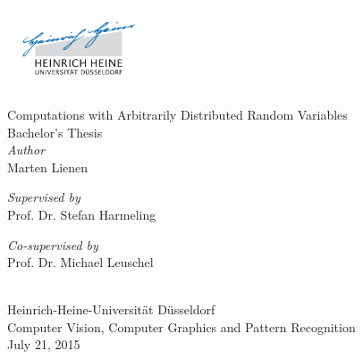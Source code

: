 \documentclass[11pt,a4paper]{book}
\begin{document}
\pagestyle{empty}

\frontmatter


\begin{titlepage}
  \begingroup
  \begin{center}
    \includegraphics[width=120pt]{thesis/logo}\\

    \vspace{9em}

    {\Huge Computations with Arbitrarily Distributed Random Variables}\\
    \vspace{2em}
    {\large Bachelor's Thesis}\\
    \vfill
    \small{\emph{Author}}\\
    \vspace{0.3em}
    {\LARGE Marten Lienen}\\
    \vspace{6em}
    \begin{minipage}{0.4\textwidth}
      \begin{flushleft}
        \small{\emph{Supervised by}}\\
        \vspace{0.3em}
        {\large Prof. Dr. Stefan Harmeling}
      \end{flushleft}
    \end{minipage}
    \hfill
    \begin{minipage}{0.4\textwidth}
      \begin{flushright}
        \small{\emph{Co-supervised by}}\\
        \vspace{0.3em}
        {\large Prof. Dr. Michael Leuschel}
      \end{flushright}
    \end{minipage}
    \\
    \vspace{4em}
    {\Large Heinrich-Heine-Universität Düsseldorf}\\
    \vspace{0.5em}
    {\large Computer Vision, Computer Graphics and Pattern Recognition}\\
    \vspace{1em}
    July 21, 2015
  \end{center}
  \endgroup
\end{titlepage}
\end{document}
